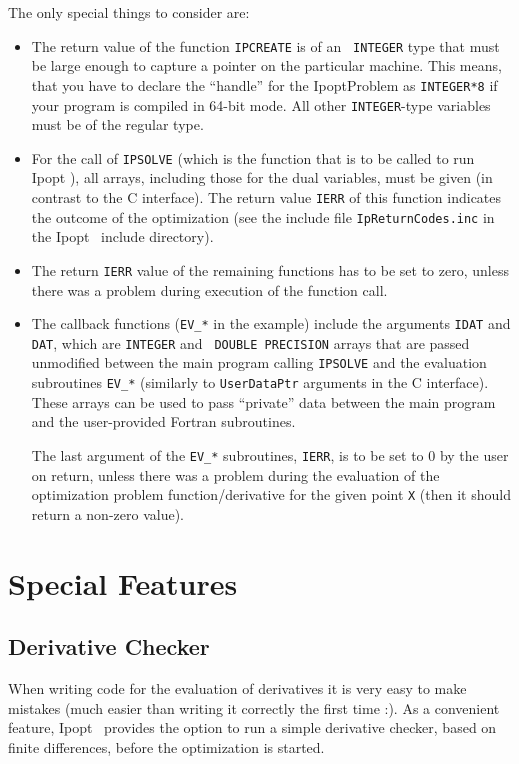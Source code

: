 \documentclass[10pt]{article}
\newcommand{\Ipopt}{{\sc Ipopt }}
\begin{document}
The only special things to consider are:
\begin{itemize}
\item The return value of the function {\tt IPCREATE} is of an {\tt
    INTEGER} type that must be large enough to capture a pointer
  on the particular machine.  This means, that you have to declare
  the ``handle'' for the IpoptProblem as {\tt INTEGER*8} if your
  program is compiled in 64-bit mode.  All other {\tt INTEGER}-type
  variables must be of the regular type.
\item For the call of {\tt IPSOLVE} (which is the function that is to
  be called to run \Ipopt), all arrays, including those for the dual
  variables, must be given (in contrast to the C interface).  The
  return value {\tt IERR} of this function indicates the outcome of
  the optimization (see the include file {\tt IpReturnCodes.inc} in
  the \Ipopt\ include directory).
\item The return {\tt IERR} value of the remaining functions has to be
  set to zero, unless there was a problem during execution of the
  function call.
\item The callback functions ({\tt EV\_*} in the example) include the
  arguments {\tt IDAT} and {\tt DAT}, which are {\tt INTEGER} and {\tt
    DOUBLE PRECISION} arrays that are passed unmodified between the
  main program calling {\tt IPSOLVE} and the evaluation subroutines
  {\tt EV\_*} (similarly to {\tt UserDataPtr} arguments in the C
  interface).  These arrays can be used to pass ``private'' data
  between the main program and the user-provided Fortran subroutines.

  The last argument of the {\tt EV\_*} subroutines, {\tt IERR}, is to
  be set to 0 by the user on return, unless there was a problem
  during the evaluation of the optimization problem
  function/derivative for the given point {\tt X} (then it should
  return a non-zero value).
\end{itemize}

\section{Special Features}
\subsection{Derivative Checker}\label{sec:deriv-checker}
When writing code for the evaluation of derivatives it is very easy to
make mistakes (much easier than writing it correctly the first time
:).  As a convenient feature, \Ipopt\ provides the option to run a
simple derivative checker, based on finite differences, before the
optimization is started.
\end{document}
